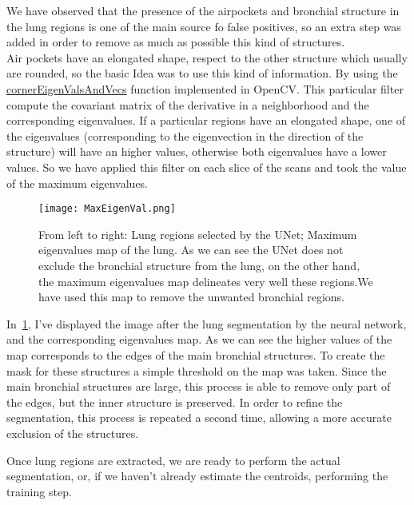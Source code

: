 \documentclass{standalone}
\begin{document}
	We have observed that the presence of the airpockets and bronchial structure in the lung regions is one of the main source fo false positives, so an extra step was added in order to remove as much as possible this kind of structures.\\ Air pockets have an elongated shape, respect to the other structure which usually are rounded, so the basic Idea was to use this kind of information. By using the \href{https://www.docs.opencv.org/master/dd/d1a/group__imgproc__feature.html#ga04723e007ed888ddf11d9ba04e2232de}{cornerEigenValsAndVecs} function implemented in OpenCV. This particular filter compute the covariant matrix of the derivative in a neighborhood and the corresponding eigenvalues. If a particular regions have an elongated shape, one of the eigenvalues (corresponding to the eigenvection in the direction of the structure) will have an higher values, otherwise both eigenvalues have a lower values. So we have applied this filter on each slice of the scans and took the value of the maximum eigenvalues. 
	\begin{figure}[h!]
		\centering
			\texttt{[image: MaxEigenVal.png]}
			\caption{From left to right: Lung regions selected by the UNet; Maximum eigenvalues map of the lung. As we can see the UNet does not exclude the bronchial structure from the lung, on the other hand, the maximum eigenvalues map delineates very well these regions.We have used this map to remove the unwanted bronchial regions.}\label{fig:MaxEigenval}
	\end{figure}

	In \figurename\,\ref{fig:MaxEigenval}, I've displayed the image after the lung segmentation by the neural network, and the corresponding eigenvalues map. As we can see the higher values of the map corresponds to the edges of the main bronchial structures. To create the mask for these structures a simple threshold on the map was taken. Since the main bronchial structures are large, this process is able to remove only part of the edges, but the inner structure is preserved. In order to refine the segmentation, this process is repeated a second time, allowing a more accurate exclusion of the structures.
		
	Once lung regions are extracted, we are ready to perform the actual segmentation, or, if we haven't already estimate the centroids, performing the training step.\\
	
\end{document}
